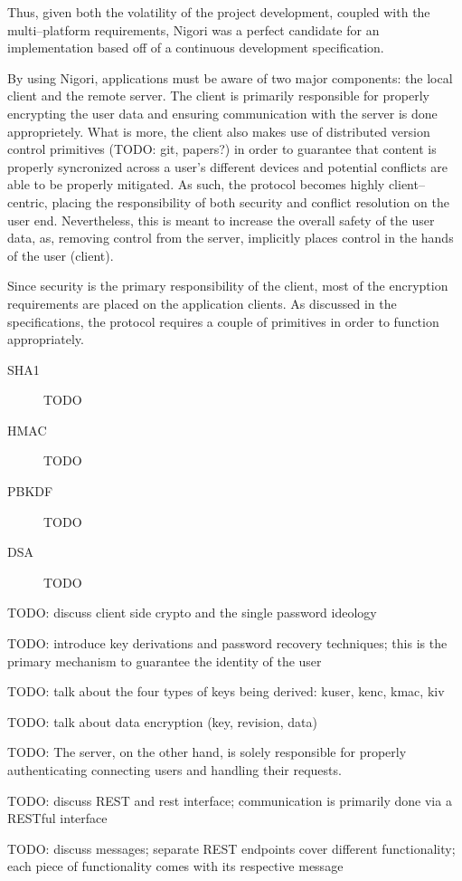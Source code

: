 Thus, given both the volatility of the project development, coupled with the multi--platform requirements, Nigori was a perfect candidate for an implementation based off of a continuous development specification.

By using Nigori, applications must be aware of two major components: the local client and the remote server.
The client is primarily responsible for properly encrypting the user data and ensuring communication with the server is done approprietely.
What is more, the client also makes use of distributed version control primitives (TODO: git, papers?) in order to guarantee that content is properly syncronized across a user's different devices and potential conflicts are able to be properly mitigated.
As such, the protocol becomes highly client--centric, placing the responsibility of both security and conflict resolution on the user end.
Nevertheless, this is meant to increase the overall safety of the user data, as, removing control from the server, implicitly places control in the hands of the user (client).

Since security is the primary responsibility of the client, most of the encryption requirements are placed on the application clients.
As discussed in the specifications, the protocol requires a couple of primitives in order to function appropriately.
\begin{description}
  \item[SHA1] TODO
  \item[HMAC] TODO
  \item[PBKDF] TODO
  \item[DSA] TODO
\end{description}

TODO: discuss client side crypto and the single password ideology

TODO: introduce key derivations and password recovery techniques; this is the primary mechanism to guarantee the identity of the user

TODO: talk about the four types of keys being derived: kuser, kenc, kmac, kiv

TODO: talk about data encryption (key, revision, data)

TODO: The server, on the other hand, is solely responsible for properly authenticating connecting users and handling their requests.

TODO: discuss REST and rest interface; communication is primarily done via a RESTful interface

TODO: discuss messages; separate REST endpoints cover different functionality; each piece of functionality comes with its respective message

